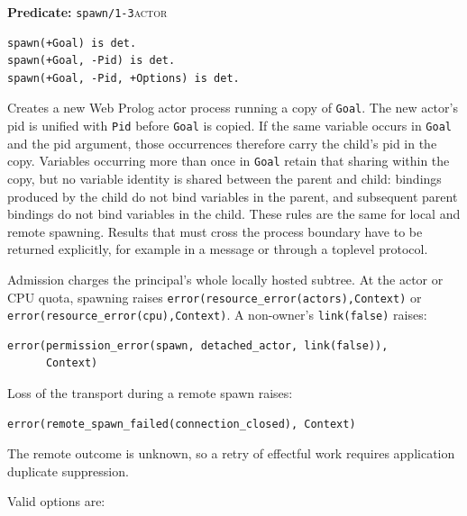 \noindent \textbf{Predicate:} \texttt{spawn/\allowbreak{}1-3}\hfill\textsc{actor}

\begin{verbatim}
spawn(+Goal) is det.
spawn(+Goal, -Pid) is det.
spawn(+Goal, -Pid, +Options) is det.
\end{verbatim}

\noindent Creates a new Web Prolog actor process running a copy
of \texttt{Goal}. The new actor's pid is unified with \texttt{Pid} before
\texttt{Goal} is copied. If the same variable occurs in \texttt{Goal} and
the pid argument, those occurrences therefore carry the child's pid in the
copy. Variables occurring more than once in \texttt{Goal} retain
that sharing within the copy, but no variable identity is shared between the
parent and child: bindings produced by the child do not bind variables in the
parent, and subsequent parent bindings do not bind variables in the child.
These rules are the same for local and remote spawning. Results that must
cross the process boundary have to be returned explicitly, for example in a
message or through a toplevel protocol. 

Admission charges the principal's whole locally hosted subtree.
At the actor or CPU quota, spawning raises
\texttt{error(\allowbreak{}resource\_\allowbreak{}error(\allowbreak{}actors),\allowbreak{}Context)} or
\texttt{error(\allowbreak{}resource\_\allowbreak{}error(\allowbreak{}cpu),\allowbreak{}Context)}. A non-owner's
\texttt{link(\allowbreak{}false)} raises:
\begin{verbatim}
error(permission_error(spawn, detached_actor, link(false)),
      Context)
\end{verbatim}
\noindent Loss of the transport during a remote spawn raises:
\begin{verbatim}
error(remote_spawn_failed(connection_closed), Context)
\end{verbatim}
\noindent The remote outcome is unknown, so a retry of effectful work
requires application duplicate suppression.

Valid options are:

